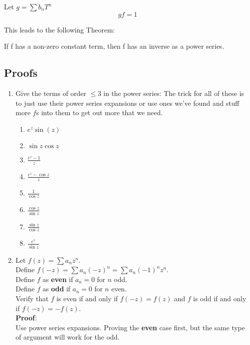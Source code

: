 \begin{defn}
  Let $g = \sum b_n T^n$
  \[gf = 1\]
\end{defn}
This leads to the following Theorem:
\begin{thm}
  If f has a non-zero constant term, then f has an inverse as a power series.
\end{thm}

\subsection{Proofs}
\begin{enumerate}
  \item Give the terms of order $\leq 3$ in the power series:
  The trick for all of these is to just use their power series expansions or use ones we've found and stuff more $f$s into them 
  to get out more that we need.
  \begin{enumerate}
    \item $e^z \sin(z)$
    \item $\sin z \cos z$
    \item $\frac{e^z - 1}{z}$
    \item $\frac{e^z - \cos z}{z}$
    \item $\frac{1}{\cos z}$
    \item $\frac{\cos z}{\sin z}$
    \item $\frac{\sin z}{\cos z}$
    \item $\frac{e^z}{\sin z}$
  \end{enumerate}
  
  \item Let $f(z) = \sum a_n z^n$. \\
  Define $f(-z) = \sum a_n (-z)^n = \sum a_n(-1)^n z^n$. \\
  Define $f$ as \textbf{even} if $a_n = 0$ for $n$ odd. \\
  Define $f$ as \textbf{odd} if $a_n = 0$ for $n$ even. \\
  Verify that $f$ is even if and only if $f(-z) = f(z)$ and $f$ is odd if and only if $f(-z) = -f(z).$ \\

  \textbf{Proof}: \\
  Use power series expansions. Proving the \textbf{even} case first, but the same type of argument will work for the odd.


\end{enumerate}
